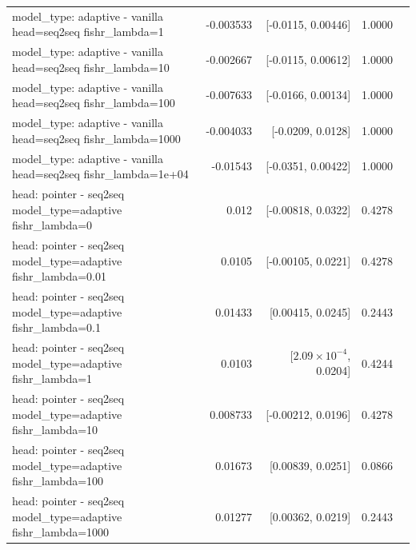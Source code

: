 \documentclass[10pt]{article}
\makeatletter
\newcommand{\stackcell}[1]{\begin{tabular}[t]{@{}l@{}}#1\end{tabular}}
\makeatother
\begin{document}
{\begin{longtable}{lrrrl}
\stackcell{model\_type: adaptive - vanilla\\\footnotesize head=seq2seq fishr\_lambda=1 } & -0.003533 & [-0.0115, 0.00446] & 1.0000 & \\
\stackcell{model\_type: adaptive - vanilla\\\footnotesize head=seq2seq fishr\_lambda=10 } & -0.002667 & [-0.0115, 0.00612] & 1.0000 & \\
\stackcell{model\_type: adaptive - vanilla\\\footnotesize head=seq2seq fishr\_lambda=100 } & -0.007633 & [-0.0166, 0.00134] & 1.0000 & \\
\stackcell{model\_type: adaptive - vanilla\\\footnotesize head=seq2seq fishr\_lambda=1000 } & -0.004033 & [-0.0209, 0.0128] & 1.0000 & \\
\stackcell{model\_type: adaptive - vanilla\\\footnotesize head=seq2seq fishr\_lambda=1e+04 } & -0.01543 & [-0.0351, 0.00422] & 1.0000 & \\
\stackcell{head: pointer - seq2seq\\\footnotesize model\_type=adaptive fishr\_lambda=0 } & 0.012 & [-0.00818, 0.0322] & 0.4278 & \\
\stackcell{head: pointer - seq2seq\\\footnotesize model\_type=adaptive fishr\_lambda=0.01 } & 0.0105 & [-0.00105, 0.0221] & 0.4278 & \\
\stackcell{head: pointer - seq2seq\\\footnotesize model\_type=adaptive fishr\_lambda=0.1 } & 0.01433 & [0.00415, 0.0245] & 0.2443 & \\
\stackcell{head: pointer - seq2seq\\\footnotesize model\_type=adaptive fishr\_lambda=1 } & 0.0103 & [$2.09\times10^{-4}$, 0.0204] & 0.4244 & \\
\stackcell{head: pointer - seq2seq\\\footnotesize model\_type=adaptive fishr\_lambda=10 } & 0.008733 & [-0.00212, 0.0196] & 0.4278 & \\
\stackcell{head: pointer - seq2seq\\\footnotesize model\_type=adaptive fishr\_lambda=100 } & 0.01673 & [0.00839, 0.0251] & 0.0866 & \\
\stackcell{head: pointer - seq2seq\\\footnotesize model\_type=adaptive fishr\_lambda=1000 } & 0.01277 & [0.00362, 0.0219] & 0.2443 & \\

\end{longtable}}
\end{document}
